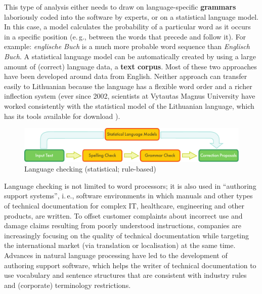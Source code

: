 \documentclass[]{../metanetpaper}
\begin{document}
\begin{multicols}{2}
This type of analysis either needs to draw on language-specific \textbf{grammars} laboriously coded into the software by experts, or on a statistical language model. In this case, a model calculates the probability of a particular word as it occurs in a specific position (e.\,g., between the words that precede and follow it). For example: \textit{englische Buch} is a much more probable word sequence than \textit{Englisch Buch}. A statistical language model can be automatically created by using a large amount of (correct) language data, a \textbf{text corpus}. Most of these two approaches have been developed around data from English. Neither approach can transfer easily to Lithuanian because the language has a flexible word order and a richer inflection system (ever since 2002, scientists at Vytautas Magnus University have worked consistently with the statistical model of the Lithuanian language, which has its tools available for download \cite{airenas}).

\begin{figure}[htb]
  \center
  \includegraphics[width=\textwidth]{../_media/english/language_checking}
  \caption{Language checking (statistical; rule-based)}
  \label{fig:langcheckingaarch_en}
\end{figure}

Language checking is not limited to word processors; it is also used in “authoring support systems”, i.\,e., software environments in which manuals and other types of technical documentation for complex IT, healthcare, engineering and other products, are written. To offset customer complaints about incorrect use and damage claims resulting from poorly understood instructions, companies are increasingly focusing on the quality of technical documentation while targeting the international market (via translation or localisation) at the same time. Advances in natural language processing have led to the development of authoring support software, which helps the writer of technical documentation to use vocabulary and sentence structures that are consistent with industry rules and (corporate) terminology restrictions.



\end{multicols}
\end{document}
